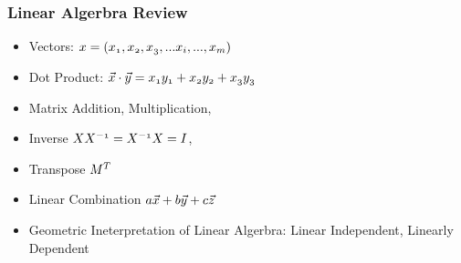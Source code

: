 \documentclass[notheorems, aspectratio=54]{beamer}
\begin{document}
\begin{frame}
\frametitle{Linear Algerbra Review}
\begin{itemize}
\item Vectors: $\mathnormal{x=(x_1, x_2, x_3,...x_i, ..., x_m)}$
\item Dot Product: $\mathnormal{\vec{x}\cdot\vec{y}=x_1 y_1+x_2 y_2+x_3 y_3}$
\item Matrix Addition, Multiplication, 
\item Inverse $\mathnormal{{X}X^{-1}=X^{-1}X=I}$, 
\item Transpose $\mathnormal{M^{T}}$
\item Linear Combination $\mathnormal{a\vec{x}+b\vec{y}+c\vec{z}}$
\item Geometric Ineterpretation of Linear Algerbra: Linear Independent, Linearly Dependent
\end{itemize}
\end{frame}
\end{document}
